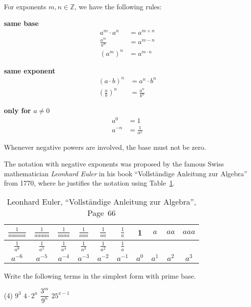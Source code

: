 \begin{tcolorbox}
	For exponents $m,n\in\mathbb Z$, we have the following rules:
	\begin{multicols}{3}
		\centering
		\textbf{same base}\\
		\begin{align*}
			a^m\cdot a^n&=a^{m+n} \\[10pt]
			\frac{a^m}{a^n}&=a^{m-n} \\[10pt]
			\left(a^m\right)^n&=a^{m\cdot n}
		\end{align*}
		\vfill
		\columnbreak

		\textbf{same exponent}\\
		\begin{align*}
			\left(a\cdot b\right)^n&=a^n\cdot b^n \\[10pt]
			\left(\frac{a}{b}\right)^n&=\frac{a^n}{b^n}
		\end{align*}
		\vfill
		\columnbreak

		\textbf{only for $a\neq 0$}\\
		\begin{align*}
			a^0&=1 \\[10pt]
			a^{-n}&=\frac{1}{a^n}
		\end{align*}
		\vfill
	\end{multicols}
	Whenever negative powers are involved, the base must not be zero.
\end{tcolorbox}
The notation with negative exponents was proposed by the famous Swiss mathematician \textit{Leonhard Euler} in his book ``Vollständige Anleitung zur Algebra'' from 1770, where he justifies the notation using Table~\ref{tab:euler_powers}.
\begin{table}[ht]
	\centering
	\renewcommand{\arraystretch}{1.5}
	\begin{tabular}{|c|c|c|c|c|c|c|c|c|c|} \hline
		$\frac{1}{aaaaaa}$ & $\frac{1}{aaaaa}$ & $\frac{1}{aaaa}$ & $\frac{1}{aaa}$ & $\frac{1}{aa}$ & $\frac{1}{a}$ & 1 & $a$ & $aa$ & $aaa$ \\ \hline
		$\frac{1}{a^6}$ & $\frac{1}{a^5}$ & $\frac{1}{a^4}$ & $\frac{1}{a^3}$ & $\frac{1}{a^2}$ & $\frac{1}{a}$ & & & & \\ \hline
		$a^{-6}$ & $a^{-5}$ & $a^{-4}$ & $a^{-3}$ & $a^{-2}$ & $a^{-1}$ & $a^0$ & $a^1$ & $a^2$ & $a^3$ \\ \hline
	\end{tabular}
	\caption{Leonhard Euler, ``Vollständige Anleitung zur Algebra'', Page~66}
	\label{tab:euler_powers}
\end{table}
\begin{exercise}
	Write the following terms in the simplest form with prime base.
	\begin{tasks}(4)
		\task $9^3$
		\task $4\cdot 2^n$
		\task $\dfrac{3^m}{9^n}$
		\task $25^{x-1}$
	\end{tasks}
\end{exercise}
